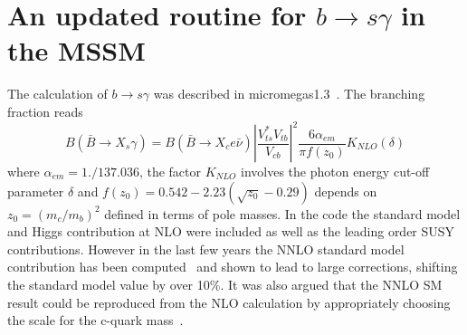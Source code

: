 \documentclass[12pt,a4paper]{article}
\begin{document}



\appendix
\section{An updated routine for $b\rightarrow s\gamma$ in the MSSM}
The calculation of $b\rightarrow s\gamma$ was described in micromegas1.3~\cite{Belanger:2004yn}. 
The branching fraction reads
\begin{equation}
B(\bar{B}\rightarrow X_s \gamma) =B(\bar{B}\rightarrow X_c e\bar\nu) \left|\frac{V_{ts}^* V_{tb}}
{V_{cb}}\right|^2 \frac{6\alpha_{em}}{\pi f(z_0)} K_{NLO}(\delta)
\label{eq:bsg}
\end{equation}
where $\alpha_{em}=1./137.036$, the factor $K_{NLO}$ involves the photon energy cut-off parameter
$\delta$ and $f(z_0)=0.542-2.23(\sqrt{z_0} -0.29)$ depends on $z_0=(m_c/m_b)^2$ defined in terms of pole
masses.  
In the code 
the standard model and Higgs contribution at NLO were included as well as the leading order SUSY
contributions. However in the last few years
 the NNLO standard model contribution has been computed~\cite{Misiak:2006zs} and shown to lead to large corrections, shifting
 the standard model value by over 10\%. 
 It was also argued that the NNLO SM result could be reproduced from
 the NLO calculation by appropriately choosing the scale for the c-quark mass~\cite{Misiak:2006ab,Gambino:2008fj}. 
\end{document}
